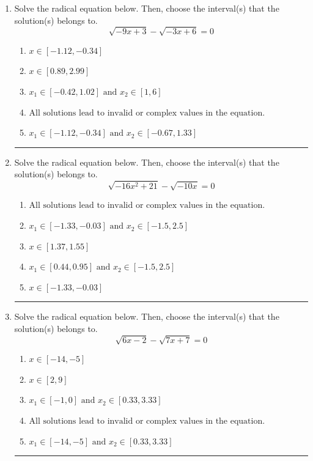\documentclass[14pt]{extbook}
\newcommand{\litem}[1]{\item#1\hspace*{-1cm}\rule{\textwidth}{0.4pt}}
\begin{document}
\begin{enumerate}
{\begin{enumerate}[label=\Alph*.]
\end{enumerate} }
\litem{
Solve the radical equation below. Then, choose the interval(s) that the solution(s) belongs to.\[ \sqrt{-9 x + 3} - \sqrt{-3 x + 6} = 0 \]\begin{enumerate}[label=\Alph*.]
\item \( x \in [-1.12,-0.34] \)
\item \( x \in [0.89,2.99] \)
\item \( x_1 \in [-0.42, 1.02] \text{ and } x_2 \in [1,6] \)
\item \( \text{All solutions lead to invalid or complex values in the equation.} \)
\item \( x_1 \in [-1.12, -0.34] \text{ and } x_2 \in [-0.67,1.33] \)

\end{enumerate} }
\litem{
Solve the radical equation below. Then, choose the interval(s) that the solution(s) belongs to.\[ \sqrt{-16 x^2 + 21} - \sqrt{-10 x} = 0 \]\begin{enumerate}[label=\Alph*.]
\item \( \text{All solutions lead to invalid or complex values in the equation.} \)
\item \( x_1 \in [-1.33, -0.03] \text{ and } x_2 \in [-1.5,2.5] \)
\item \( x \in [1.37,1.55] \)
\item \( x_1 \in [0.44, 0.95] \text{ and } x_2 \in [-1.5,2.5] \)
\item \( x \in [-1.33,-0.03] \)

\end{enumerate} }
\litem{
Solve the radical equation below. Then, choose the interval(s) that the solution(s) belongs to.\[ \sqrt{6 x - 2} - \sqrt{7 x + 7} = 0 \]\begin{enumerate}[label=\Alph*.]
\item \( x \in [-14,-5] \)
\item \( x \in [2,9] \)
\item \( x_1 \in [-1, 0] \text{ and } x_2 \in [0.33,3.33] \)
\item \( \text{All solutions lead to invalid or complex values in the equation.} \)
\item \( x_1 \in [-14, -5] \text{ and } x_2 \in [0.33,3.33] \)


\end{enumerate}}
\end{enumerate}
\end{document}
